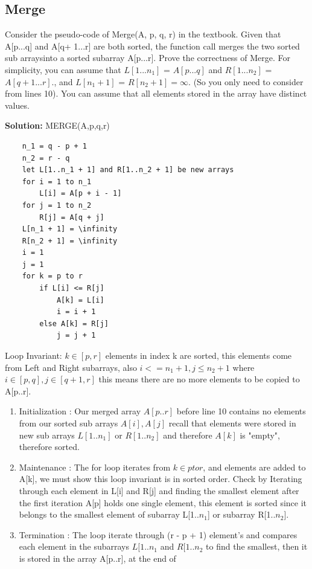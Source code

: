 \documentclass[11pt,fleqn]{book}
\begin{document}
\subsection{Merge}
\begin{example}
Consider the pseudo-code of Merge(A, p, q, r) in the textbook.  Given that A[p...q] and A[q+ 1...r] are both sorted, the function call merges the two sorted sub arraysinto a sorted subarray A[p...r].  Prove the correctness of Merge.  For simplicity,  you can assume that $L[1...n_1]$ = $A[p...q]$ and $R[1...n_2]$ = $A[q+1...r]$., and $L[n_1+1]$ = $R[n_2+1] = \infty$. (So you only need to consider from lines 10).  You can assume that all elements stored in the array have distinct values. 
\end{example}
\textbf{Solution: } 
MERGE(A,p,q,r)
    \begin{lstlisting}
    n_1 = q - p + 1
    n_2 = r - q
    let L[1..n_1 + 1] and R[1..n_2 + 1] be new arrays 
    for i = 1 to n_1 
        L[i] = A[p + i - 1]
    for j = 1 to n_2 
        R[j] = A[q + j]
    L[n_1 + 1] = \infinity 
    R[n_2 + 1] = \infinity
    i = 1 
    j = 1 
    for k = p to r 
        if L[i] <= R[j]
            A[k] = L[i]
            i = i + 1
        else A[k] = R[j]
            j = j + 1
    \end{lstlisting} 
    \vspace{1em}
    Loop Invariant: $k \in [p,r]$ elements in index k are sorted, this elements come from Left and Right subarrays, also $i <= n_1 + 1, j \leq n_2 + 1$ where $i \in [p,q], j \in [q+1,r]$ this means there are no more elements to be copied to A[p..r].
    \vspace{1em}
\begin{enumerate}
    \item Initialization : Our merged array $A[p..r]$ before line 10 contains no elements from our sorted sub arrays $A[i] , A[j]$ recall that elements were stored in new sub arrays $L[1..n_1]$ or $R[1..n_2]$ and therefore $A[k]$ is "empty", therefore sorted. 
    \item Maintenance :  The for loop iterates from $k \in p to r$, and elements are added to A[k], we must show this loop invariant is in sorted order. Check by Iterating through each element in L[i] and R[j] and finding the smallest element after the first iteration A[p] holds one single element, this element is sorted since it belongs to the smallest element of subarray L[1..$n_1$] or subarray R[1..$n_2$]. 
    \item Termination : The loop iterate through (r - p + 1) element's and compares each element in the subarrays $L[1..n_1$ and $R[1..n_2$ to find the smallest, then it is stored in the array A[p..r], at the end of
\end{enumerate}
\end{document}
